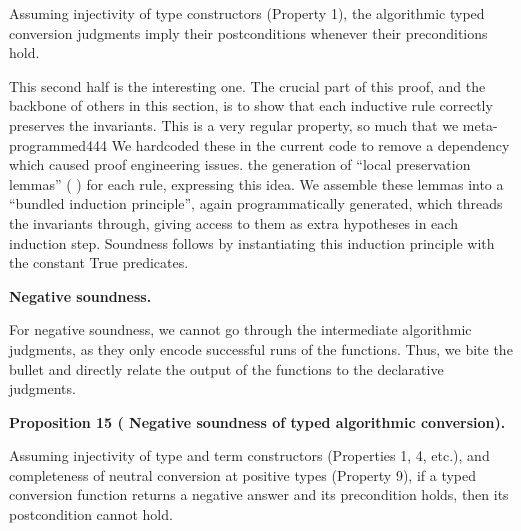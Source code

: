 \documentclass[10pt,a4paper]{amsart}
\begin{document}
Assuming injectivity of type constructors (Property 1), the algorithmic typed conversion judgments imply their postconditions whenever their preconditions hold.\par
 
 
 
 
This second half is the interesting one. The crucial part of this proof, and the backbone of others in this section, is to show that each inductive rule correctly preserves the invariants. This is a very regular property, so much that we meta-programmed444 We hardcoded these in the current code to remove a dependency which caused proof engineering issues.  the generation of “local preservation lemmas” ( ) for each rule, expressing this idea. We assemble these lemmas into a “bundled induction principle”, again programmatically generated, which threads the invariants through, giving access to them as extra hypotheses in each induction step. Soundness follows by instantiating this induction principle with the constant True predicates.\par
 
 
 
 
\par\medskip\noindent\textbf{Negative soundness.}\par
 
 
For negative soundness, we cannot go through the intermediate algorithmic judgments, as they only encode successful runs of the functions. Thus, we bite the bullet and directly relate the output of the functions to the declarative judgments.\par
 
 
 
\par\medskip\noindent\textbf{Proposition 15 (  Negative soundness of typed algorithmic conversion).}\par
 
 
Assuming injectivity of type and term constructors (Properties 1, 4, etc.), and completeness of neutral conversion at positive types (Property 9), if a typed conversion function returns a negative answer and its precondition holds, then its postcondition cannot hold.\par
 
\end{document}

